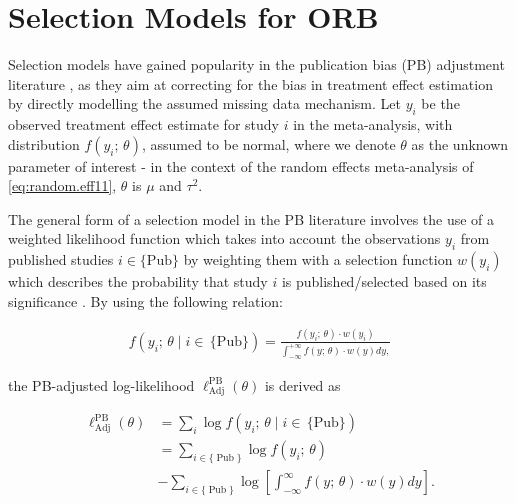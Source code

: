 \documentclass[twocolumn]{article}\usepackage[]{graphicx}\usepackage[]{xcolor}
\begin{document}
\section{Selection Models for ORB} \label{selmodORB}
Selection models have gained popularity in the publication bias (PB) adjustment literature \citep{DerSimonian, selection1, selection2, reviewselection, handbook}, as they aim at correcting for the bias in treatment effect estimation by directly modelling the assumed missing data mechanism. Let $y_i$ be the observed treatment effect estimate for study $i$ in the meta-analysis, with distribution $f(y_i \text{; } \theta)$, assumed to be normal, where we denote $\theta$ as the unknown parameter of interest - in the context of the random effects meta-analysis of \eqref{eq:random.eff11}, $\theta$ is $\mu$ and $\tau^2$.

The general form of a selection model in the PB literature involves the use of a weighted likelihood function which takes into account the observations $y_i$ from published studies $i \in \{\text{Pub} \}$ by weighting them with a selection function $w(y_i)$ which describes the probability that study $i$ is published/selected based on its significance \citep{selection1, selection2, reviewselection}. By using the following relation:


\begin{equation}
\label{PB.selection11}
\begin{aligned}
f \left( y_i \text{; } \theta \mid i \in \, \{\text{Pub}\} \right) %
= \frac{f(y_i \text{; } \theta) \cdot w(y_i)}{\int^{+\infty}_{-\infty} f(y \text{; } \theta) \cdot w(y) dy,}
\end{aligned}
\end{equation}


the PB-adjusted log-likelihood $\ell_{\text{Adj}}^{\text{PB}} \left( \theta  \right)$ is derived \citep{selection0, HedgesVev, selection1, selection2} as



\begin{equation*}
\begin{aligned}
\label{lik.PB}
\ell_{\text{Adj}}^{\text{PB}}\left(\theta \right) &= \sum_{i} \log f \left(y_i \text{; } \theta \mid i \in \, \{\text{Pub}\} \right)\\
& = \sum_{i \in \{\operatorname{Pub}\}} \log f(y_i \text{; } \theta) \\
& - \sum_{i \in \{\operatorname{Pub}\}} \log \left[ \int_{-\infty}^{\infty} f(y \text{; } \theta) \cdot w(y)  d y \right] \text{.}
\end{aligned}
\end{equation*}
\end{document}
